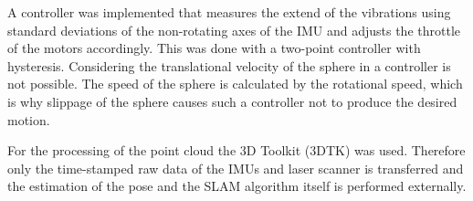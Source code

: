 A controller was implemented that measures the extend of the vibrations using standard deviations of the non-rotating axes of the IMU and adjusts the throttle of the motors accordingly.
This was done with a two-point controller with hysteresis.
Considering the translational velocity of the sphere in a controller is not possible.
The speed of the sphere is calculated by the rotational speed, which is why slippage of the sphere causes such a controller not to produce the desired motion. 

For the processing of the point cloud the 3D Toolkit (3DTK) was used.
Therefore only the time-stamped raw data of the IMUs and laser scanner is transferred and the estimation of the pose and the SLAM algorithm itself is performed externally.

